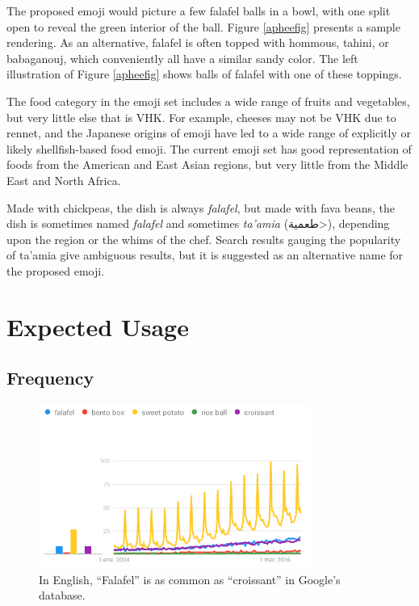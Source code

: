 \documentclass[a4paper,10pt]{article}
\begin{document}
The proposed emoji would picture a few falafel balls in a bowl, with one
split open to reveal the green interior of the ball. Figure \ref{apheefig} presents
a sample rendering. As an alternative, falafel is often topped with hommous, tahini,
or babaganouj, which conveniently all have a similar sandy color. The left illustration
of Figure \ref{apheefig} shows balls of falafel with one of these toppings.

The food category in the emoji set includes a wide range of fruits and vegetables, but
very little else that is VHK. For example, cheeses may not be VHK due to rennet, and the
Japanese origins of emoji have led to a wide range of explicitly or likely
shellfish-based food emoji. The current emoji set has good representation of foods
from the American and East Asian regions, but very little from the Middle East and
North Africa.

Made with chickpeas, the dish is always {\em falafel}, but made with fava beans, the dish
is sometimes named {\em falafel} and sometimes {\em ta'amia} (\<طعمية>), depending upon the
region or the whims of the chef. Search results gauging the popularity of {\sc ta'amia} give
ambiguous results, but it is suggested as an alternative name for the proposed emoji.

\section{Expected Usage}
\enlargethispage{\baselineskip} %
\enlargethispage{\baselineskip}

\subsection{Frequency}\label{freqsec}

\begin{figure}
\begin{center}
\includegraphics[width=3.5in]{trends.png}
\end{center}
\caption{In English, ``Falafel'' is as common as ``croissant'' in Google's database.}
\label{engplot}
\end{figure}
\end{document}
